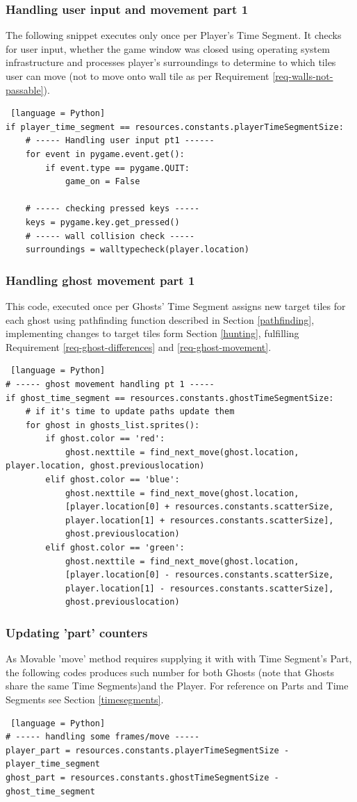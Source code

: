 \documentclass[11pt,a4paper,notitlepage]{report}
\begin{document}
				\subsubsection{Handling user input and movement part 1}
					The following snippet executes only once per Player's Time Segment. It checks for user input, whether the game window was closed using operating system infrastructure and processes player's surroundings to determine to which tiles user can move (not to move onto wall tile as per Requirement \ref{req-walls-not-passable}).
					\begin{lstlisting} [language = Python]
if player_time_segment == resources.constants.playerTimeSegmentSize:
	# ----- Handling user input pt1 ------
	for event in pygame.event.get():
		if event.type == pygame.QUIT:
			game_on = False

	# ----- checking pressed keys -----
	keys = pygame.key.get_pressed()
	# ----- wall collision check -----
	surroundings = walltypecheck(player.location)
					\end{lstlisting}
				\subsubsection{Handling ghost movement part 1}
					This code, executed once per Ghosts' Time Segment assigns new target tiles for each ghost using pathfinding function described in Section \ref{pathfinding}, implementing changes to target tiles form Section \ref{hunting}, fulfilling Requirement \ref{req-ghost-differences} and \ref{req-ghost-movement}.
					\begin{lstlisting} [language = Python]
# ----- ghost movement handling pt 1 -----
if ghost_time_segment == resources.constants.ghostTimeSegmentSize:
	# if it's time to update paths update them
	for ghost in ghosts_list.sprites():
		if ghost.color == 'red':
			ghost.nexttile = find_next_move(ghost.location, player.location, ghost.previouslocation)
		elif ghost.color == 'blue':
			ghost.nexttile = find_next_move(ghost.location,
			[player.location[0] + resources.constants.scatterSize,
			player.location[1] + resources.constants.scatterSize],
			ghost.previouslocation)
		elif ghost.color == 'green':
			ghost.nexttile = find_next_move(ghost.location,
			[player.location[0] - resources.constants.scatterSize,
			player.location[1] - resources.constants.scatterSize],
			ghost.previouslocation)
					\end{lstlisting}
				\subsubsection{Updating 'part' counters}
					As Movable 'move' method requires supplying it with with Time Segment's Part, the following codes produces such number for both Ghosts (note that Ghosts share the same Time Segments)and the Player. For reference on Parts and Time Segments see Section \ref{timesegments}.
					\begin{lstlisting} [language = Python]
# ----- handling some frames/move -----
player_part = resources.constants.playerTimeSegmentSize - player_time_segment
ghost_part = resources.constants.ghostTimeSegmentSize - ghost_time_segment
					\end{lstlisting}
\end{document}
